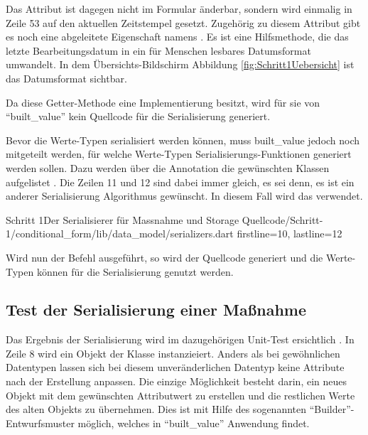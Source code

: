 Das Attribut  ist dagegen nicht im Formular änderbar, sondern wird einmalig in Zeile 53 auf den aktuellen Zeitstempel gesetzt.
Zugehörig zu diesem Attribut gibt es noch eine abgeleitete Eigenschaft namens  .  Es ist eine Hilfsmethode, die das letzte Bearbeitungsdatum in ein für Menschen lesbares Datumsformat umwandelt. In dem Übersichts-Bildschirm Abbildung \ref{fig:Schritt1Uebersicht} ist das Datumsformat sichtbar.

Da diese Getter-Methode eine Implementierung besitzt, wird für sie von \enquote{built_value} kein Quellcode für die Serialisierung generiert.

Bevor die Werte-Typen serialisiert werden können, muss built_value jedoch noch mitgeteilt werden, für welche Werte-Typen Serialisierungs-Funktionen generiert werden sollen.
Dazu werden über die Annotation  die gewünschten Klassen aufgelistet .
Die Zeilen 11 und 12 sind dabei immer gleich, es sei denn, es ist ein anderer Serialisierung Algorithmus gewünscht.
In diesem Fall wird das verwendet.

\begin{alexlisting}{Schritt 1}{Der Serialisierer für Massnahme und Storage}
  {Quellcode/Schritt-1/conditional_form/lib/data_model/serializers.dart}
  {firstline=10, lastline=12}
  \label{lst:Schritt1Serialisierer}
\end{alexlisting}


Wird nun der Befehl   ausgeführt, so wird der Quellcode generiert und die Werte-Typen können für die Serialisierung genutzt werden.

\subsection{Test der Serialisierung einer Maßnahme}

Das Ergebnis der Serialisierung wird im dazugehörigen Unit-Test ersichtlich \Lst{\ref{lst:SerialisierungEinerMassnahmeUnittest}}.
In Zeile 8 wird ein Objekt der Klasse  instanzieiert.
Anders als bei gewöhnlichen Datentypen lassen sich bei diesem unveränderlichen Datentyp keine Attribute nach der Erstellung anpassen.
Die einzige Möglichkeit besteht darin, ein neues Objekt  mit dem gewünschten Attributwert zu erstellen und die restlichen Werte des alten Objekts zu übernehmen.
Dies ist mit Hilfe des sogenannten \enquote{Builder}-Entwurfsmuster möglich, welches in \enquote{built_value} Anwendung findet.

